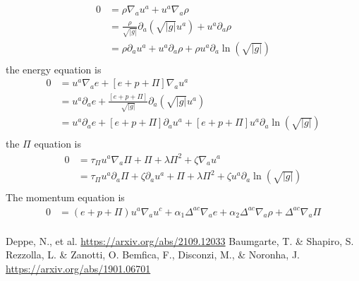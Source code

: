 \documentclass[12pt]{article}
\numberwithin{equation}{section}
\begin{document}
\begin{equation}
\begin{aligned}
0 &= \rho \nabla_{a} u^a + u^a \nabla_{a} \rho \\
&= \frac{\rho}{\sqrt{|g|}} \partial_{a} (\sqrt{|g|} u^a) + u^a \partial_{a} \rho \\
&= \rho \partial_{a} u^a + u^a \partial_{a} \rho + \rho u^a \partial_{a} \ln(\sqrt{|g|}) \\
\end{aligned}
\end{equation}
the energy equation is
\begin{equation}
\begin{aligned}
0 &= u^a \nabla_{a} e + [e + p + \Pi] \nabla_{a} u^a \\
&= u^a \partial_{a} e + \frac{[e + p + \Pi]}{\sqrt{|g|}} \partial_{a} (\sqrt{|g|} u^a) \\
&= u^a \partial_{a} e + [e + p + \Pi] \partial_{a} u^a + [e + p + \Pi] u^a \partial_{a} \ln(\sqrt{|g|}) \\
\end{aligned}
\end{equation}
the $\Pi$ equation is
\begin{equation}
\begin{aligned}
0 &= \tau_{\Pi} u^a \nabla_a \Pi + \Pi + \lambda \Pi^2 + \zeta \nabla_a u^a \\
&= \tau_{\Pi} u^a \partial_a \Pi + \zeta \partial_a u^a + \Pi + \lambda \Pi^2 + \zeta u^a \partial_a \ln(\sqrt{|g|}) \\
\end{aligned}
\end{equation}
The momentum equation is
\begin{equation}
\begin{aligned}
0 &= (e + p + \Pi) u^a \nabla_{a} u^c + \alpha_1 \Delta^{ac} \nabla_a e + \alpha_2 \Delta^{ac} \nabla_a \rho + \Delta^{ac} \nabla_{a} \Pi \\
\end{aligned}
\end{equation}

\clearpage

\begin{thebibliography}{10}
 Deppe, N., et al. \url{https://arxiv.org/abs/2109.12033}
 Baumgarte, T. \& Shapiro, S.
 Rezzolla, L. \& Zanotti, O.
 Bemfica, F., Disconzi, M., \& Noronha, J. \url{https://arxiv.org/abs/1901.06701}
\end{thebibliography}
\end{document}
